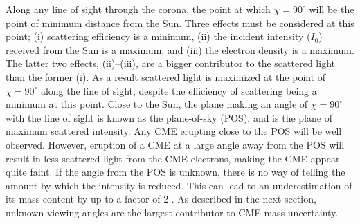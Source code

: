 Along any line of sight through the corona, the point at which $\chi = 90^{\circ}$ will be the point of minimum distance from the Sun. Three effects must be considered at this point; (i) scattering efficiency is a minimum, (ii) the incident intensity ($I_0$) received from the Sun is a maximum, and (iii) the electron density is a maximum. The latter two effects, (ii)--(iii), are a bigger contributor to the scattered light than the former (i). As a result scattered light is maximized at the point of $\chi = 90^{\circ}$ along the line of sight, despite the efficiency of scattering being a minimum at this point. Close to the Sun, the plane making an angle of $\chi = 90^{\circ}$ with the line of sight is known as the plane-of-sky (POS), and is the plane of maximum scattered intensity. Any CME erupting close to the POS will be well observed. However, eruption of a CME at a large angle away from the POS will result in less scattered light from the CME electrons, making the CME appear quite faint. If the angle from the POS is unknown, there is no way of telling the amount by which the intensity is reduced. 
This can lead to an underestimation of its mass content by up to a factor of 2 \citep{vou00}. As described in the next section, unknown viewing angles are the largest contributor to CME mass uncertainty.

